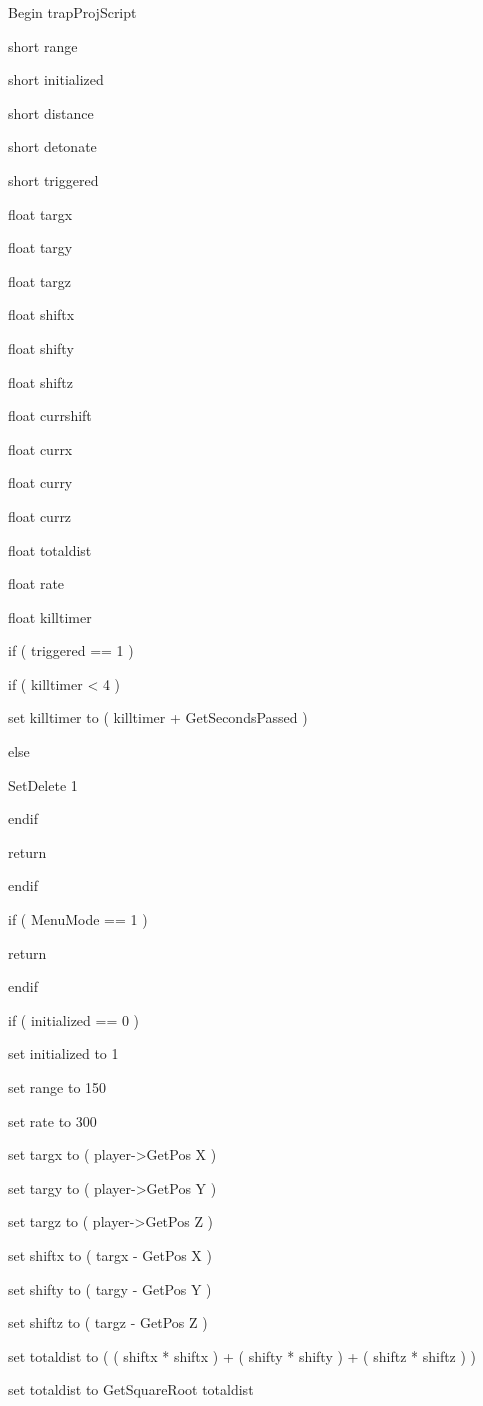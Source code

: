\documentclass[
]{article}
\begin{document}
Begin trapProjScript

short range

short initialized

short distance

short detonate

short triggered

float targx

float targy

float targz

float shiftx

float shifty

float shiftz

float currshift

float currx

float curry

float currz

float totaldist

float rate

float killtimer

if ( triggered == 1 )

if ( killtimer \textless{} 4 )

set killtimer to ( killtimer + GetSecondsPassed )

else

SetDelete 1

endif

return

endif

if ( MenuMode == 1 )

return

endif

if ( initialized == 0 )

set initialized to 1

set range to 150

set rate to 300

set targx to ( player-\textgreater GetPos X )

set targy to ( player-\textgreater GetPos Y )

set targz to ( player-\textgreater GetPos Z )

set shiftx to ( targx - GetPos X )

set shifty to ( targy - GetPos Y )

set shiftz to ( targz - GetPos Z )

set totaldist to ( ( shiftx * shiftx ) + ( shifty * shifty ) + ( shiftz
* shiftz ) )

set totaldist to GetSquareRoot totaldist
\end{document}
